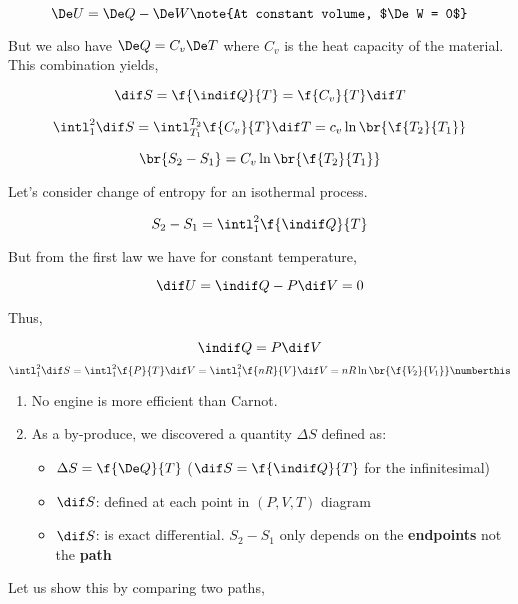 \documentclass{article}
\begin{document}
\[ \De U = \De Q - \De W \note{At constant volume, $\De W = 0$} \]

But we also have $\De Q = C_v \De T$ where $C_v$ is the heat capacity of the material. This combination yields,

\[ \dif S = \f{\indif Q}{T} = \f{C_v}{T}\dif T \]

\[ \intl_1^2 \dif S = \intl_{T_1}^{T_2} \f{C_v}{T} \dif T = c_v \ln\br{\f{T_2}{T_1}} \]

\[ \br{S_2 - S_1} = C_v \ln\br{\f{T_2}{T_1}} \]


Let's consider change of entropy for an isothermal process.

\[ S_2 - S_1 = \intl_1^2 \f{\indif Q}{T} \]

But from the first law we have for constant temperature,

\[ \dif U = \indif Q - P \dif V = 0  \]

Thus,

\[ \indif Q = P \dif V \]
\[ \intl_1^2 \dif S = \intl_1^2 \f{P}{T}\dif V = \intl_1^2 \f{nR}{V}\dif V = nR \ln\br{\f{V_2}{V_1}} \numberthis \label{eq:isothermvolumechangeentropy} \]


\begin{enumerate}
    \item No engine is more efficient than Carnot.
    \item As a by-produce, we discovered a quantity $\Delta S$ defined as:
    \begin{itemize}
        \item $\Delta S = \f{\De Q}{T}$ ($\dif S = \f{\indif Q}{T}$ for the infinitesimal)
        \item $\dif S$: defined at each point in $(P,V,T)$ diagram
        \item $\dif S$: is exact differential. $S_2 - S_1$ only depends on the \textbf{endpoints} not the \textbf{path}
    \end{itemize}
\end{enumerate}

Let us show this by comparing two paths,
\end{document}
